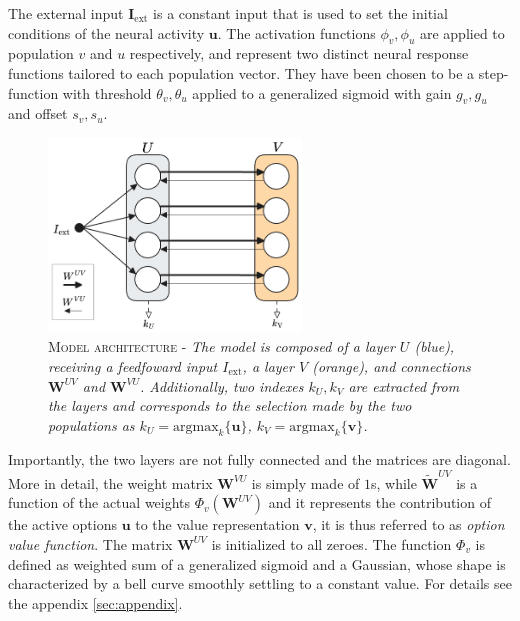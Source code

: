 \noindent The external input $\textbf{I}_{\text{ext}}$ is a constant input that is used to set the initial conditions of the neural activity $\textbf{u}$.
The activation functions $\phi_{v},\phi_{u}$ are applied to population $v$ and $u$ respectively, and represent two distinct neural response functions tailored to each population vector.
They have been chosen to be a step-function with threshold $\theta_{v},\theta_{u}$ applied to a generalized sigmoid with gain $g_{v},g_{u}$ and offset $s_{v},s_{u}$.

\begin{figure}[ht]
    \centering
    \includegraphics[width=0.6\textwidth]{figures/minb_architecture.png}
    \caption{\textsc{Model architecture} - \textit{The model is composed of a layer $U$ (blue), receiving a feedfoward input $I_{\text{ext}}$, a layer $V$ (orange), and connections $\textbf{W}^{UV}$ and $\textbf{W}^{VU}$. Additionally, two indexes $k_{U}, k_{V}$  are extracted from the layers and
    corresponds to the selection made by the two populations as $k_{U}=\text{argmax}_{k} \{\textbf{u}\}$, $k_{V}=\text{argmax}_{k} \{\textbf{v}\}$.}}
    \label{fig:main_architecture}
\end{figure}

\noindent Importantly, the two layers are not fully connected and the matrices are diagonal.
More in detail, the weight matrix $\textbf{W}^{VU}$ is simply made of $1$s, while $\widetilde{\textbf{W}}^{UV}$ is a function of the actual weights $\Phi_{v}(\textbf{W}^{UV})$ and it represents the contribution of the active options $\textbf{u}$ to the value representation $\textbf{v}$, it is thus
referred to as \textit{option value function}. The matrix $\textbf{W}^{UV}$ is initialized to all zeroes.
The function $\Phi_{v}$ is defined as weighted sum of a generalized sigmoid and a Gaussian, whose shape is characterized by a bell curve smoothly settling to a constant value. For details see the appendix \ref{sec:appendix}.

